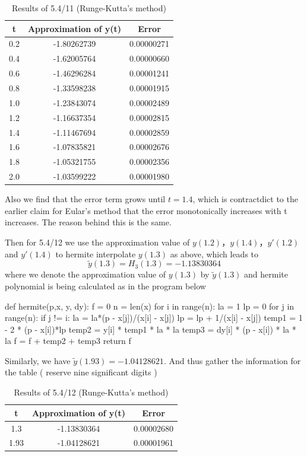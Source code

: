 \documentclass{article}
\begin{document}
    \begin{table}[htbp]
    \centering
    \caption{Results of 5.4/11 (Runge-Kutta's method)}
    \begin{tabular}{c|c|c}
    \toprule
    t& \textbf{Approximation of y(t)} & \textbf{Error} \\ 
    \midrule
    0.2 & -1.80262739 & 0.00000271\\
    0.4 & -1.62005764 & 0.00000660\\
    0.6 & -1.46296284 & 0.00001241\\
    0.8 & -1.33598238 & 0.00001915\\
    1.0 & -1.23843074 & 0.00002489\\
    1.2 & -1.16637354 & 0.00002815\\
    1.4 & -1.11467694 & 0.00002859\\
    1.6 & -1.07835821 & 0.00002676\\
    1.8 & -1.05321755 & 0.00002356\\
    2.0 & -1.03599222 & 0.00001980\\
    \bottomrule
    \end{tabular}
    \end{table}

    Also we find that the error term grows until $t=1.4$, which is contractdict to the earlier claim for Eular's method that the error monotonically increases with t increases. The reason behind this is the same.

    Then for  5.4/12 we use the approximation value of $y(1.2)$，$y(1.4)$，$y'(1.2)$ and $y'(1.4)$ to hermite interpolate $y(1.3)$ as above, which leads to 
    $$ \tilde{y}(1.3)=H_{3}(1.3)=-1.13830364
    $$
    where we denote the approximation value of $y(1.3)$ by $\tilde{y}(1.3)$ and hermite polynomial is being calculated as in the program below
    \begin{python}
    def hermite(p,x, y, dy):
    f = 0
    n = len(x)
    for i in range(n):
        la = 1
        lp = 0
        for j in range(n):
            if j != i:
                la = la*(p - x[j])/(x[i] - x[j])
                lp = lp + 1/(x[i] - x[j])
        temp1 = 1 - 2 * (p - x[i])*lp
        temp2 = y[i] * temp1 * la * la
        temp3 = dy[i] * (p - x[i]) * la * la
        f = f + temp2 + temp3
    return f
    \end{python}
    Similarly, we have $\tilde{y}(1.93)=-1.04128621$. And thus gather the information for the table ( reserve nine significant digits )
    \begin{table}[htbp]
    \centering
    \caption{Results of 5.4/12 (Runge-Kutta's method)}
    \begin{tabular}{c|c|c}
    \toprule
    t& \textbf{Approximation of y(t)} & \textbf{Error} \\ 
    \midrule
    1.3 & -1.13830364 & 0.00002680 \\
    1.93 & -1.04128621 & 0.00001961\\
    \bottomrule
    \end{tabular}
    \end{table}
\end{document}
